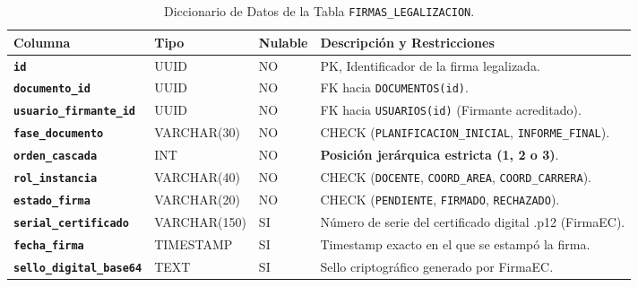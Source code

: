 \documentclass[12pt,a4paper]{article}
\begin{document}
\begin{table}[htbp]
\centering
\small
\begin{tabularx}{\textwidth}{|>{\hsize=0.7\hsize\bfseries}X|>{\hsize=0.55\hsize}X|>{\hsize=0.3\hsize\centering\arraybackslash}X|>{\hsize=1.45\hsize}X|}
    \hline
    \rowcolor{tableheader}
    Columna & Tipo & Nulable & Descripción y Restricciones \\
    \hline
    \texttt{id} & UUID & NO & PK, Identificador de la firma legalizada. \\
    \hline
    \texttt{documento\_id} & UUID & NO & FK hacia \texttt{DOCUMENTOS(id)}. \\
    \hline
    \texttt{usuario\_firmante\_id} & UUID & NO & FK hacia \texttt{USUARIOS(id)} (Firmante acreditado). \\
    \hline
    \texttt{fase\_documento} & VARCHAR(30) & NO & CHECK (\texttt{PLANIFICACION\_INICIAL}, \texttt{INFORME\_FINAL}). \\
    \hline
    \texttt{orden\_cascada} & INT & NO & \textbf{Posición jerárquica estricta (1, 2 o 3)}. \\
    \hline
    \texttt{rol\_instancia} & VARCHAR(40) & NO & CHECK (\texttt{DOCENTE}, \texttt{COORD\_AREA}, \texttt{COORD\_CARRERA}). \\
    \hline
    \texttt{estado\_firma} & VARCHAR(20) & NO & CHECK (\texttt{PENDIENTE}, \texttt{FIRMADO}, \texttt{RECHAZADO}). \\
    \hline
    \texttt{serial\_certificado} & VARCHAR(150) & SI & Número de serie del certificado digital .p12 (FirmaEC). \\
    \hline
    \texttt{fecha\_firma} & TIMESTAMP & SI & Timestamp exacto en el que se estampó la firma. \\
    \hline
    \texttt{sello\_digital\_base64} & TEXT & SI & Sello criptográfico generado por FirmaEC. \\
    \hline
\end{tabularx}
\caption{Diccionario de Datos de la Tabla \texttt{FIRMAS\_LEGALIZACION}.}
\label{tab:s2_04_firmas}
\end{table}
\end{document}
